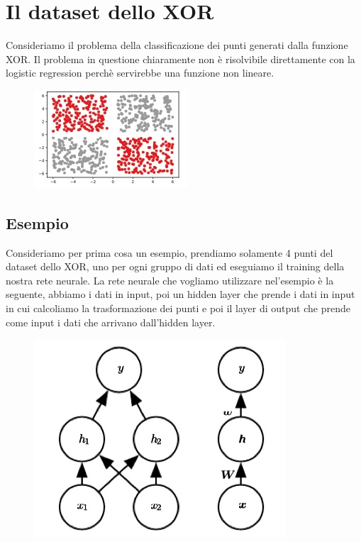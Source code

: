 \documentclass[14pt]{extreport}
\begin{document}
\section{Il dataset dello XOR}

Consideriamo il problema della classificazione dei punti generati dalla funzione XOR. Il problema in questione chiaramente non è risolvibile
direttamente con la logistic regression perchè servirebbe una funzione non lineare.

\begin{figure}[H]
\centering
\includegraphics[width=0.7\linewidth]{355.jpeg}
\end{figure}

\subsection{Esempio}

Consideriamo per prima cosa un esempio, prendiamo solamente 4 punti del dataset dello XOR, uno per ogni gruppo di dati ed eseguiamo il training della
nostra rete neurale. La rete neurale che vogliamo utilizzare nel'esempio è la seguente, abbiamo i dati in input, poi un hidden layer che prende i dati
in input in cui calcoliamo la trasformazione dei punti e poi il layer di output che prende come input i dati che arrivano dall'hidden layer.

\begin{figure}[H]
\centering
\includegraphics[width=0.7\linewidth]{356.jpeg}
\end{figure}
\end{document}
